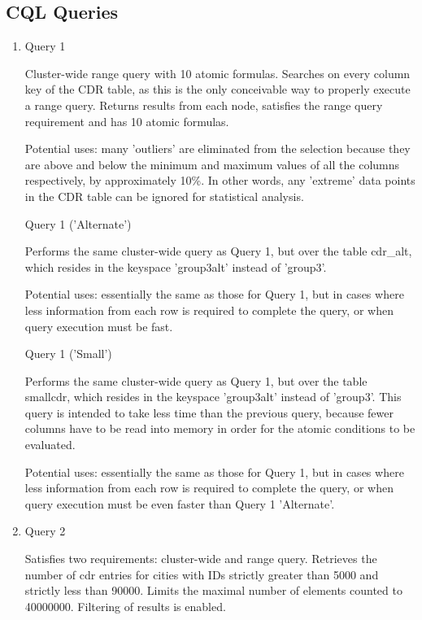 \documentclass[letterpaper]{article}
\begin{document}
\subsection{CQL Queries}

\begin{enumerate}
	\item Query 1
		

		Cluster-wide range query with 10 atomic formulas. Searches on
		every column key of the CDR table, as this is the only
		conceivable way to properly execute a range query.  Returns
		results from each node, satisfies the range query requirement
		and has 10 atomic formulas.

		Potential uses: many 'outliers' are eliminated from the
		selection because they are above and below the minimum and
		maximum values of all the columns
		respectively, by approximately 10\%. In other words, any
		'extreme' data points in the CDR table can be ignored for
		statistical analysis.

		Query 1 ('Alternate')
		

		Performs the same cluster-wide query as Query 1, but over the table cdr\_alt,
		which resides in the keyspace 'group3alt' instead of 'group3'.

		Potential uses: essentially the same as those for Query 1, but in cases
		where less information from each row is required to complete the query,
		or when query execution must be fast.

		Query 1 ('Small')
		

		Performs the same cluster-wide query as Query 1, but over the table smallcdr,
		which resides in the keyspace 'group3alt' instead of 'group3'. This query
		is intended to take less time than the previous query, because fewer columns
		have to be read into memory in order for the atomic conditions to be evaluated.

		Potential uses: essentially the same as those for Query 1, but in cases
		where less information from each row is required to complete the query,
		or when query execution must be even faster than Query 1 'Alternate'.

	\item Query 2
		

		Satisfies two requirements: cluster-wide and range query. Retrieves the number of
		cdr entries for cities with IDs strictly greater than 5000 and strictly less than
		90000. Limits the maximal number of elements counted to 40000000. Filtering of
		results is enabled.


\end{enumerate}
\end{document}
